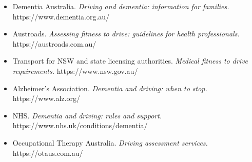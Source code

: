 \begin{itemize}
    \item Dementia Australia. \textit{Driving and dementia: information for families.} https://www.dementia.org.au/
    \item Austroads. \textit{Assessing fitness to drive: guidelines for health professionals.} https://austroads.com.au/
    \item Transport for NSW and state licensing authorities. \textit{Medical fitness to drive requirements.} https://www.nsw.gov.au/
    \item Alzheimer's Association. \textit{Dementia and driving: when to stop.} https://www.alz.org/
    \item NHS. \textit{Dementia and driving: rules and support.} https://www.nhs.uk/conditions/dementia/
    \item Occupational Therapy Australia. \textit{Driving assessment services.} https://otaus.com.au/
\end{itemize}
